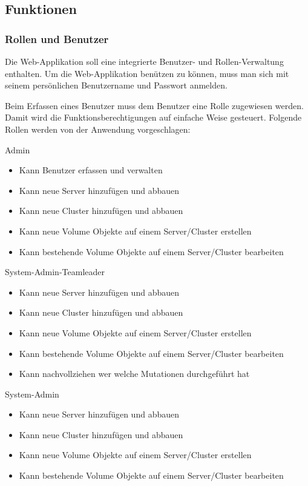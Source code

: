\subsection{Funktionen}

\subsubsection{Rollen und Benutzer}
Die Web-Applikation soll eine integrierte Benutzer- und Rollen-Verwaltung enthalten.
Um die Web-Applikation benützen zu können, muss man sich mit seinem persönlichen Benutzername und Passwort anmelden.

Beim Erfassen eines Benutzer muss dem Benutzer eine Rolle zugewiesen werden. Damit wird die Funktionsberechtigungen auf einfache Weise gesteuert.
Folgende Rollen werden von der Anwendung vorgeschlagen:

Admin
\begin{itemize}
\item Kann Benutzer erfassen und verwalten
\item Kann neue Server hinzufügen und abbauen
\item Kann neue Cluster hinzufügen und abbauen
\item Kann neue Volume Objekte auf einem Server/Cluster erstellen
\item Kann bestehende Volume Objekte auf einem Server/Cluster bearbeiten
\end{itemize}

System-Admin-Teamleader
\begin{itemize}
\item Kann neue Server hinzufügen und abbauen
\item Kann neue Cluster hinzufügen und abbauen
\item Kann neue Volume Objekte auf einem Server/Cluster erstellen
\item Kann bestehende Volume Objekte auf einem Server/Cluster bearbeiten
\item Kann nachvollziehen wer welche Mutationen durchgeführt hat
\end{itemize}

System-Admin
\begin{itemize}
\item Kann neue Server hinzufügen und abbauen
\item Kann neue Cluster hinzufügen und abbauen
\item Kann neue Volume Objekte auf einem Server/Cluster erstellen
\item Kann bestehende Volume Objekte auf einem Server/Cluster bearbeiten
\end{itemize}

